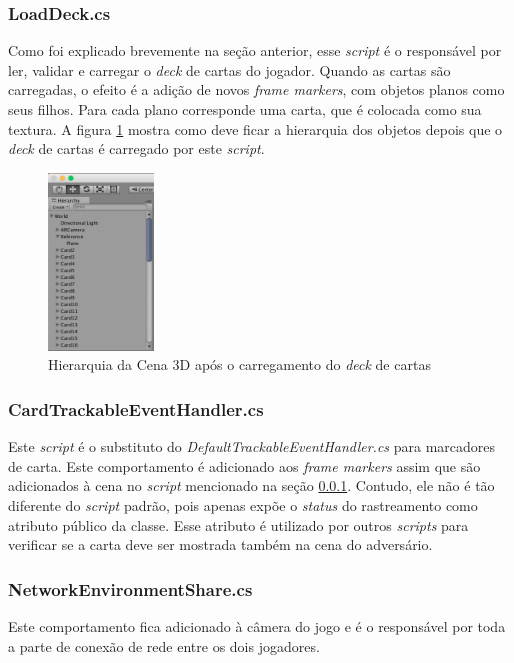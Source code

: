 \documentclass[conference]{IEEEtran}
\begin{document}
\subsubsection{LoadDeck.cs}
\label{loadeck}
Como foi explicado brevemente na seção anterior, esse \textit{script} é o 
responsável por ler, validar e carregar o \textit{deck} de cartas do jogador.
Quando as cartas são carregadas, o efeito é a adição de novos 
\textit{frame markers}, com objetos planos como seus filhos. Para cada plano 
corresponde uma carta, que é colocada como sua textura. A figura \ref{cardsld} 
mostra como deve ficar a hierarquia dos objetos depois que o \textit{deck} de 
cartas é carregado por este \textit{script}.

\begin{figure}[t]
	\caption{Hierarquia da Cena 3D após o carregamento do \textit{deck}
		 de cartas}
	\label{cardsld}
	\centering
	\includegraphics[width=0.25\textwidth]{hierarchyloaded}
\end{figure}

\subsubsection{CardTrackableEventHandler.cs}
\label{cardtracker}
Este \textit{script} é o substituto do \textit{DefaultTrackableEventHandler.cs} 
para marcadores de carta. Este comportamento é adicionado aos 
\textit{frame markers} assim que são adicionados à cena no \textit{script} 
mencionado na seção \ref{loadeck}. Contudo, ele não é tão diferente do 
\textit{script} padrão, pois apenas expõe o \textit{status} do rastreamento 
como atributo público da classe. Esse atributo é utilizado por outros 
\textit{scripts} para verificar se a carta deve ser mostrada também na cena do 
adversário.

\subsubsection{NetworkEnvironmentShare.cs}
\label{networkenv}
Este comportamento fica adicionado à câmera do jogo e é o responsável por toda 
a parte de conexão de rede entre os dois jogadores.
\end{document}
